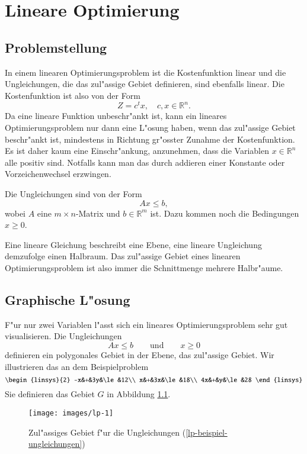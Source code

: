\chapter{Lineare Optimierung\label{chapter-lineare-optimierung}}

\section{Problemstellung}
In einem linearen Optimierungsproblem ist die Kostenfunktion linear
und die Ungleichungen, die das zul"assige Gebiet definieren, sind
ebenfalls linear. 
Die Kostenfunktion ist also von der Form
\[
Z=c^tx,\quad c,x\in\mathbb R^n.
\]
Da eine lineare Funktion unbeschr"ankt ist, kann ein lineares
Optimierungsproblem nur dann eine L"osung haben, wenn das zul"assige
Gebiet beschr"ankt ist, mindestens in Richtung gr"osster Zunahme der
Kostenfunktion. Es ist daher kaum eine Einschr"ankung, anzunehmen, dass 
die Variablen $x\in\mathbb R^n$ alle positiv sind. Notfalls kann man 
das durch addieren einer Konstante oder Vorzeichenwechsel erzwingen.

Die Ungleichungen sind von der Form
\[
Ax\le b,
\]
wobei $A$ eine $m\times n$-Matrix und $b\in\mathbb R^m$ ist.
Dazu kommen noch die Bedingungen $x\ge 0$.

Eine lineare Gleichung beschreibt eine Ebene, eine
lineare Ungleichung demzufolge einen Halbraum. Das zul"assige Gebiet
eines linearen Optimierungsproblem ist also immer die Schnittmenge
mehrere Halbr"aume.

\section{Graphische L"osung}
F"ur nur zwei Variablen l"asst sich ein lineares Optimierungsproblem
sehr gut visualisieren. Die Ungleichungen
\[
Ax\le b\qquad\text{und}\qquad x\ge 0
\]
definieren ein polygonales Gebiet in der Ebene, das zul"assige Gebiet.
Wir illustrieren das an dem Beispielproblem
\begin{equation}
\begin{linsys}{2}
-x&+&3y&\le&12\\
x&+&3x&\le&18\\
4x&+&y&\le&28
\end{linsys}
\label{lp-beispiel-ungleichungen}
\end{equation}
Sie definieren das Gebiet $G$ in Abbildung \ref{lp-beispiel}.
\begin{figure}
\begin{center}
\texttt{[image: images/lp-1]}
\end{center}
\caption{Zul"assiges Gebiet f"ur die Ungleichungen
(\ref{lp-beispiel-ungleichungen})\label{lp-beispiel}}
\end{figure}

